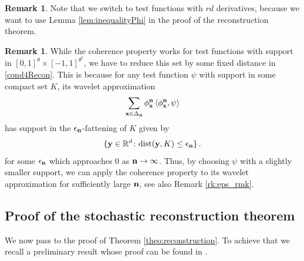 \documentclass[12pt]{article}
\numberwithin{equation}{section}
\theoremstyle{plain}
\theoremstyle{definition}
\newtheorem{remark}[theorem]{Remark}
\newcommand{\scalar}[1]{\left\langle #1 \right\rangle}
\def\bR{\mathbb{R}}\def\bS{\mathbb{S}}
\def\fy{\mathbf y}\def\fz{\mathbf z}
\begin{document}
\begin{remark}
    Note that we switch to test functions with $rd$ derivatives, because we want to use  Lemma \ref{lem:inequalityPhi} in the proof of the reconstruction theorem.
\end{remark}

\begin{remark}
While the coherence property works for test functions with support in $[0,1]^\theta\times[-1,1]^{\theta^c}$, we have to reduce this set by some fixed distance in \eqref{cond4Recon}. This is because for any test function $\psi$ with support in some compact set $K$, its wavelet approximation
    \[
        \sum_{\fx\in\Delta_\fn} \phi^\fn_\fx\scalar{\phi^\fn_\fx,\psi}
    \]
    has support in the $\epsilon_\mathbf n$-fattening of $K$ given by
    \[
        \{\fy\in\bR^d\colon \text{dist}(\fy,K)\le\epsilon_\fn\}\,.
    \]
    for some $\epsilon_\mathbf n$ which approaches $0$ as $\mathbf n\to\infty$. Thus, by choosing $\psi$ with a slightly smaller support, we can apply the coherence property to its wavelet approximation for sufficiently large $\mathbf n$, see also Remark \ref{rk:eps_rmk}.
\end{remark}


\subsection{Proof of the stochastic reconstruction theorem}

We now pass to the proof of Theorem \ref{theo:reconstruction}. To achieve that we recall a preliminary result whose proof can be found in \cite[Lemma 19]{multiparameterStochSewing}.
\end{document}
